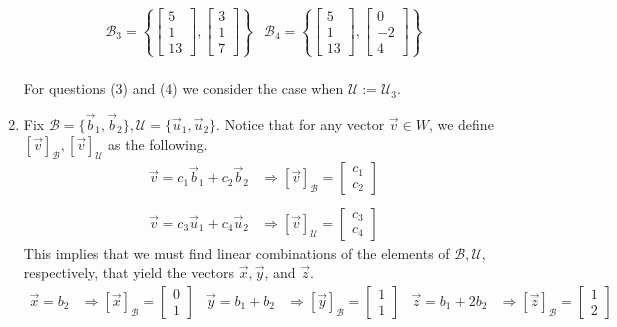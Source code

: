 \begin{SaveQuestion}
\begin{enumerate}
$$\begin{array}{ll}
             \mathcal B_3 = \left\{\begin{bmatrix} 5 \\ 1 \\ 13 \end{bmatrix},\begin{bmatrix} 3 \\ 1 \\ 7 \end{bmatrix}\right\} & \mathcal B_4 = \left\{\begin{bmatrix} 5 \\ 1 \\ 13 \end{bmatrix},\begin{bmatrix} 0 \\ -2 \\ 4 \end{bmatrix}\right\}
         \end{array}$$\\ 
         For questions (3) and (4) we consider the case when $\mathcal U := \mathcal U_3$.
         \item Fix $\mathcal B = \{\vec b_1, \vec b_2\}, \mathcal U = \{\vec u_1, \vec u_2\}$. Notice that for any vector $\vec v \in W$, we define $[\vec v]_{\mathcal B}, [\vec v]_{\mathcal U}$ as the following.
        $$\begin{array}{cr}
            \vec v = c_1 \vec b_1 + c_2 \vec b_2 & \Longrightarrow [\vec v]_{\mathcal B} = \begin{bmatrix} c_1 \\ c_2 \end{bmatrix} \\ \\
            \vec v = c_3 \vec u_1 + c_4 \vec u_2 & \Longrightarrow [\vec v]_{\mathcal U} = \begin{bmatrix} c_3 \\ c_4 \end{bmatrix}
        \end{array}$$
        This implies that we must find linear combinations of the elements of $\mathcal B, \mathcal U$, respectively, that yield the vectors $\vec x, \vec y$, and $\vec z$. 
        $$\begin{array}{rlrlrl}
            \vec x = b_2 &\Longrightarrow [\vec x]_{\mathcal B} =  \begin{bmatrix} 0 \\ 1 \end{bmatrix} & \vec y = b_1 + b_2 &\Longrightarrow [\vec y]_{\mathcal B} =  \begin{bmatrix} 1 \\ 1 \end{bmatrix} & \vec z = b_1 + 2b_2 &\Longrightarrow [\vec z]_{\mathcal B} =  \begin{bmatrix} 1 \\ 2 \end{bmatrix} \\ \\

\end{array}$$
\end{enumerate}
\end{SaveQuestion}
